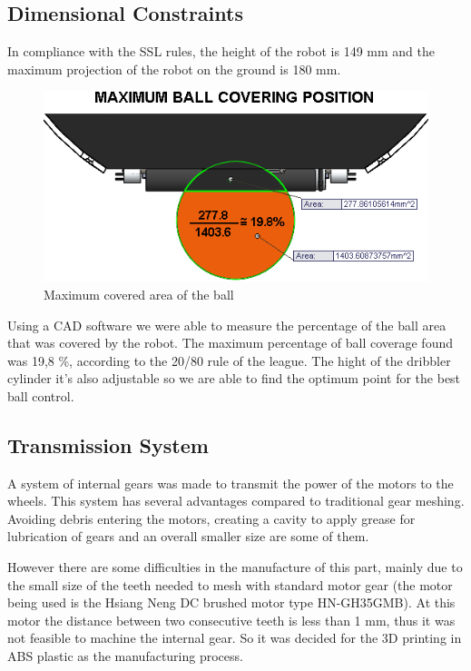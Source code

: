 \subsection{Dimensional Constraints}

In compliance with the SSL rules, the height of the robot is 149 mm and the maximum projection of the robot on the ground is 180 mm.

\begin{figure}[!htb]
	\centering
	\includegraphics[width = 0.8 \textwidth]{img/20-80_rule.png}
	\caption[]{Maximum covered area of the ball}
\end{figure}

Using a CAD software we were able to measure the percentage of the ball area that was covered by the robot. The maximum percentage of ball coverage found was 19,8 \%, according to the 20/80 rule of the league. The hight of the dribbler cylinder it's also adjustable so we are able to find the optimum point for the best ball control. 

\subsection{Transmission System}

A system of internal gears was made to transmit the power of the motors to the wheels. This system has several advantages compared to traditional gear meshing. Avoiding debris entering the motors, creating a cavity to apply grease for lubrication of gears and an overall smaller size are some of them.

However there are some difficulties in the manufacture of this part, mainly due to the small size of the teeth needed to mesh with standard motor gear (the motor being used is the Hsiang Neng DC brushed motor type HN-GH35GMB). At this motor the distance between two consecutive teeth is less than 1 mm, thus it was not feasible to machine the internal gear. So it was decided for the 3D printing in ABS plastic as the manufacturing process.

